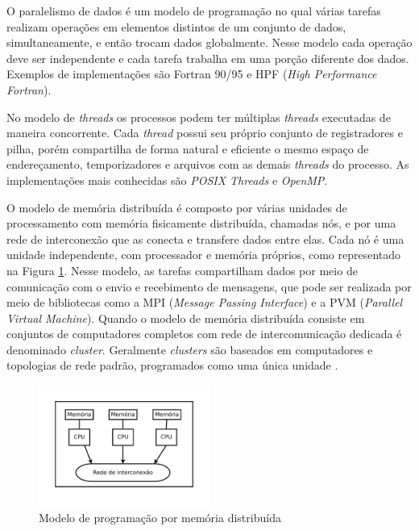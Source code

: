 O paralelismo de dados é um modelo de programação no qual várias tarefas realizam operações em elementos distintos de um conjunto de dados, simultaneamente, e então trocam dados globalmente. Nesse modelo cada operação deve ser independente e cada tarefa trabalha em uma porção diferente dos dados. Exemplos de implementações são Fortran 90/95 e HPF (\textit{High Performance Fortran}).

No modelo de \textit{threads} os processos podem ter múltiplas \textit{threads} executadas de maneira concorrente. Cada \textit{thread} possui seu próprio conjunto de registradores e pilha, porém compartilha de forma natural e eficiente o mesmo espaço de endereçamento, temporizadores e arquivos com as demais \textit{threads} do processo. As implementações mais conhecidas são \textit{POSIX Threads} e \textit{OpenMP}.

O modelo de memória distribuída é composto por várias unidades de processamento  com memória fisicamente distribuída, chamadas nós, e por uma rede de interconexão que as conecta e transfere dados entre elas. 
Cada nó é uma unidade independente, com processador e memória próprios, como representado na Figura \ref{fig:ArquiteturaDistribuida}. 
Nesse modelo, as tarefas compartilham dados por meio de comunicação com o envio e recebimento de mensagens, que pode ser realizada por meio de bibliotecas como a MPI (\textit{Message Passing Interface}) e a PVM (\textit{Parallel Virtual Machine}).
Quando o modelo de memória distribuída consiste em conjuntos de computadores completos com rede de intercomunicação dedicada é denominado \textit{cluster}. Geralmente \textit{clusters} são baseados em computadores e topologias de rede padrão, programados como uma única unidade \cite{Rauber:2010}.


\begin{figure}[htb]
\centering
\includegraphics[trim=0cm 1cm 0cm 0cm, width=0.5\textwidth]{figuras/Arquitetura.pdf}
\caption{Modelo de programação por memória distribuída}
\label{fig:ArquiteturaDistribuida}
\end{figure}


